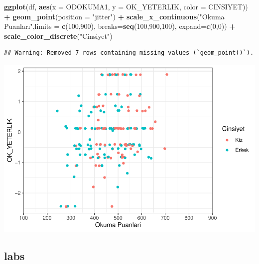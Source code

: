 \documentclass[
  oneside]{book}
\newenvironment{Shaded}{\begin{snugshade}}{\end{snugshade}}
\newcommand{\AttributeTok}[1]{\textcolor[rgb]{0.13,0.29,0.53}{#1}}
\newcommand{\DecValTok}[1]{\textcolor[rgb]{0.00,0.00,0.81}{#1}}
\newcommand{\FunctionTok}[1]{\textcolor[rgb]{0.13,0.29,0.53}{\textbf{#1}}}
\newcommand{\NormalTok}[1]{#1}
\newcommand{\SpecialCharTok}[1]{\textcolor[rgb]{0.81,0.36,0.00}{\textbf{#1}}}
\newcommand{\StringTok}[1]{\textcolor[rgb]{0.31,0.60,0.02}{#1}}
\begin{document}
\begin{Shaded}
\begin{Highlighting}[]
\FunctionTok{ggplot}\NormalTok{(df, }\FunctionTok{aes}\NormalTok{(}\AttributeTok{x =}\NormalTok{ ODOKUMA1,}
\AttributeTok{y =}\NormalTok{ OK\_YETERLIK,}
\AttributeTok{color =}\NormalTok{ CINSIYET)) }\SpecialCharTok{+}
\FunctionTok{geom\_point}\NormalTok{(}\AttributeTok{position =} \StringTok{"jitter"}\NormalTok{) }\SpecialCharTok{+}
\FunctionTok{scale\_x\_continuous}\NormalTok{(}\StringTok{"Okuma Puanları"}\NormalTok{,}\AttributeTok{limits =} \FunctionTok{c}\NormalTok{(}\DecValTok{100}\NormalTok{,}\DecValTok{900}\NormalTok{),}
                   \AttributeTok{breaks=}\FunctionTok{seq}\NormalTok{(}\DecValTok{100}\NormalTok{,}\DecValTok{900}\NormalTok{,}\DecValTok{100}\NormalTok{),}
                   \AttributeTok{expand=}\FunctionTok{c}\NormalTok{(}\DecValTok{0}\NormalTok{,}\DecValTok{0}\NormalTok{)) }\SpecialCharTok{+}
\FunctionTok{scale\_color\_discrete}\NormalTok{(}\StringTok{"Cinsiyet"}\NormalTok{)}
\end{Highlighting}
\end{Shaded}

\begin{verbatim}
## Warning: Removed 7 rows containing missing values (`geom_point()`).
\end{verbatim}

\begin{center}\includegraphics[width=1\linewidth]{15-betimleyici-istatistik_files/figure-latex/unnamed-chunk-54-1} \end{center}

\hypertarget{labs}{%
\subsection{labs}\label{labs}}
\end{document}
